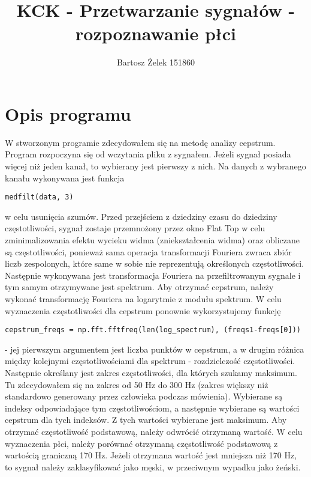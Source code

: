 \documentclass[11pt]{article}
\title{KCK - Przetwarzanie sygnałów - rozpoznawanie płci}
\author{Bartosz Żelek 151860}
\begin{document}
\maketitle
\section{Opis programu}
W stworzonym programie zdecydowałem się na metodę analizy cepstrum.
Program rozpoczyna się od wczytania pliku z sygnałem.
Jeżeli sygnał posiada więcej niż jeden kanał, to wybierany jest pierwszy z nich.
Na danych z wybranego kanału wykonywana jest funkcja \begin{verbatim}medfilt(data, 3)\end{verbatim} w celu usunięcia szumów.
Przed przejściem z dziedziny czasu do dziedziny częstotliwości, sygnał zostaje przemnożony przez okno Flat Top w celu zminimalizowania efektu wycieku widma (zniekształcenia widma) oraz obliczane są częstotliwości, ponieważ sama operacja transformacji Fouriera zwraca zbiór liczb zespolonych, które same w sobie nie reprezentują określonych częstotliwości.
Następnie wykonywana jest transformacja Fouriera na przefiltrowanym sygnale i tym samym otrzymywane jest spektrum.
Aby otrzymać cepstrum, należy wykonać transformację Fouriera na logarytmie z modułu spektrum.
W celu wyznaczenia częstotliwości dla cepstrum ponownie wykorzystujemy funkcję \begin{verbatim}cepstrum_freqs = np.fft.fftfreq(len(log_spectrum), (freqs1-freqs[0]))\end{verbatim} - jej pierwszym argumentem jest liczba punktów w cepstrum, a w drugim różnica między kolejnymi częstotliwościami dla spektrum - rozdzielczość częstotliwości.
Następnie określany jest zakres częstotliwości, dla których szukamy maksimum. Tu zdecydowałem się na zakres od 50 Hz do 300 Hz (zakres większy niż standardowo generowany przez człowieka podczas mówienia).
Wybierane są indeksy odpowiadające tym częstotliwościom, a następnie wybierane są wartości cepstrum dla tych indeksów.
Z tych wartości wybierane jest maksimum.
Aby otrzymać częstotliwość podstawową, należy odwrócić otrzymaną wartość.
W celu wyznaczenia płci, należy porównać otrzymaną częstotliwość podstawową z wartością graniczną 170 Hz. Jeżeli otrzymana wartość jest mniejsza niż 170 Hz, to sygnał należy zaklasyfikować jako męski, w przeciwnym wypadku jako żeński.
\end{document}
